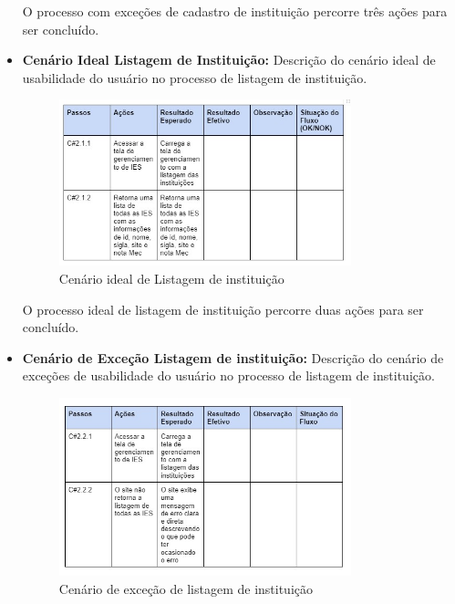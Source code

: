 \begin{itemize}
O processo com exceções de cadastro de instituição percorre três ações para ser concluído.

\newpage
    
     \item \textbf{Cenário Ideal Listagem de Instituição:}
Descrição do cenário ideal de usabilidade do usuário no processo de listagem de instituição.

\begin{figure}[ht]
        \centering
\includegraphics[width=0.80\textwidth]{images/teste-list-instituicao-feliz.jpg}
        \caption{Cenário ideal de Listagem de instituição}
        \label{commitsAturo}
    \end{figure}

O processo ideal de listagem de instituição percorre duas ações para ser concluído.


    \item \textbf{Cenário de Exceção Listagem de instituição:}
Descrição do cenário de exceções de usabilidade do usuário no processo de listagem de instituição.

\begin{figure}[ht]
        \centering
\includegraphics[width=0.80\textwidth]{images/teste-list-instituicao-excecao.jpg}
        \caption{Cenário de exceção de listagem de instituição}
        \label{commitsAturo}
    \end{figure}


\end{itemize}
